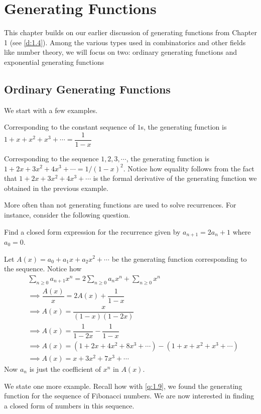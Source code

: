 \chapter{Generating Functions}
This chapter builds on our earlier discussion of generating functions from Chapter 1 (see \cref{d:1.4}). Among the various types used in combinatorics and other fields like number theory, we will focus on two: ordinary generating functions and exponential generating functions
\section{Ordinary Generating Functions}
We start with a few examples.
\begin{example}
Corresponding to the constant sequence of $1$s, the generating function is $1+x+x^2+x^3+\cdots = \dfrac{1}{1-x}$
\end{example}
\begin{example}
Corresponding to the sequence $1,2,3,\cdots$, the generating function is $1+2x+3x^2+4x^3+\cdots = 1/(1-x)^2$. Notice how equality follows from the fact that $1+2x+3x^2+4x^3+\cdots$ is the formal derivative of the generating function we obtained in the previous example.
\end{example}
More often than not generating functions are used to solve recurrences. For instance, consider the following question.
\begin{question}
Find a closed form expression for the recurrence given by $a_{n+1}=2a_n+1$ where $a_0=0$. 
\end{question}
\begin{solution}
Let $A(x)=a_0+a_1x+a_2x^2+\cdots$ be the generating function corresponding to the sequence. Notice how 
\begin{align*}
    &\sum_{n\geq 0}a_{n+1}x^n = 2\sum_{n\geq 0}a_nx^n+ \sum_{n\geq 0}x^n \\
    &\implies \dfrac{A(x)}{x} = 2A(x) + \dfrac{1}{1-x} \\
    &\implies A(x) = \dfrac{x}{(1-x)(1-2x)} \\
    &\implies A(x) = \dfrac{1}{1-2x}-\dfrac{1}{1-x} \\
    &\implies A(x) = (1+2x+4x^2+8x^3+\cdots)-(1+x+x^2+x^3+\cdots) \\
    &\implies A(x) = x+3x^2+7x^3+\cdots
\end{align*}
Now $a_n$ is just the coefficient of $x^n$ in $A(x)$. 
\end{solution}
We state one more example. Recall how with \cref{q:1.9}, we found the generating function for the sequence of Fibonacci numbers. We are now interested in finding a closed form of numbers in this sequence. 
